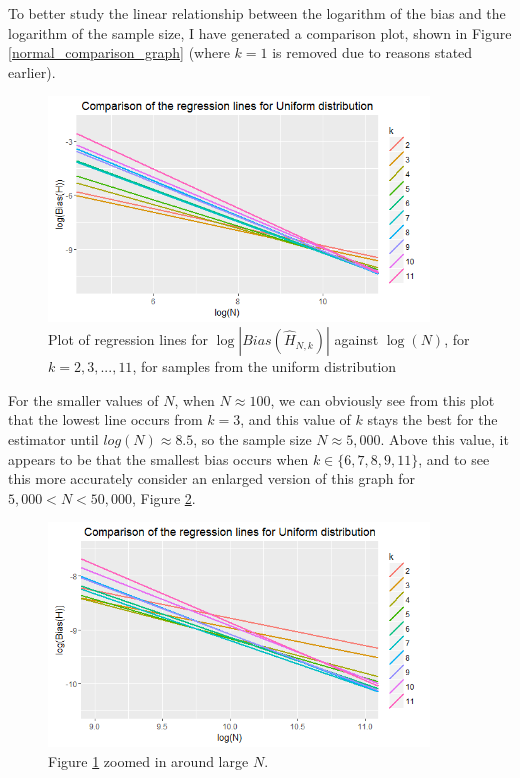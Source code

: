 \documentclass[12pt]{report}
\begin{document}
To better study the linear relationship between the logarithm of the bias and the logarithm of the sample size, I have generated a comparison plot, shown in Figure \ref{normal_comparison_graph} (where $k=1$ is removed due to reasons stated earlier).

\begin{figure}
  \begin{center}
    \includegraphics[width=0.9\textwidth]{./Graphs/Best/UniformComparison.png}
  \end{center}
\caption{Plot of regression lines for $\log|Bias(\hat{H}_{N, k})|$ against $\log(N)$, for $k=2, 3,..., 11$, for samples from the uniform distribution}
  \label{uniform_comparison_graph}
\end{figure}

For the smaller values of $N$, when $N \approx 100$, we can obviously see from this plot that the lowest line occurs from $k=3$, and this value of $k$ stays the best for the estimator until $log(N) \approx 8.5$, so the sample size $N \approx 5,000$. Above this value, it appears to be that the smallest bias occurs when $k \in \{6, 7, 8, 9, 11\}$, and to see this more accurately consider an enlarged version of this graph for $5,000 < N < 50,000$, Figure \ref{uniform_comparison_graph_zoom}.

\begin{figure}
  \begin{center}
    \includegraphics[width=0.9\textwidth]{./Graphs/Best/UniformComparisonZoom.png}
  \end{center}
\caption{Figure \ref{uniform_comparison_graph} zoomed in around large $N$.}
  \label{uniform_comparison_graph_zoom}
\end{figure}
\end{document}
